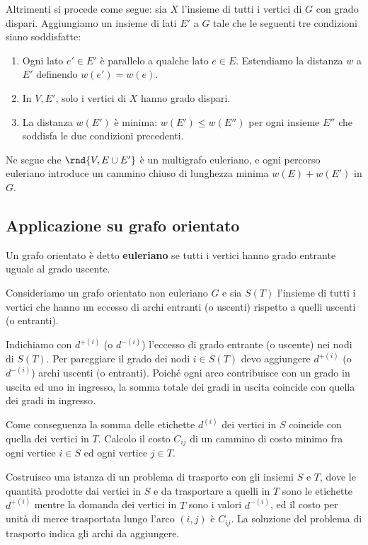 \documentclass[\main/main.tex]{subfiles}
\begin{document}
Altrimenti si procede come segue: sia \(X\) l'insieme di tutti i vertici di \(G\) con grado dispari. Aggiungiamo un insieme di lati \(E'\) a \(G\) tale che le seguenti tre condizioni siano soddisfatte:
\begin{enumerate}
	\item Ogni lato \(e' \in E'\) è parallelo a qualche lato \(e \in E\). Estendiamo la distanza \(w\) a \(E'\) definendo \(w(e') = w(e)\).
	\item In \(V, E'\), solo i vertici di \(X\) hanno grado dispari.
	\item La distanza \(w(E')\) è minima: \(w(E') \leq w(E'')\) per ogni insieme \(E''\) che soddisfa le due condizioni precedenti.
\end{enumerate}
Ne segue che \(\rnd{V, E \cup E'}\) è un multigrafo euleriano, e ogni percorso euleriano introduce un cammino chiuso di lunghezza minima \(w(E) + w(E')\) in \(G\).

\subsection{Applicazione su grafo orientato}
\begin{definition}
	Un grafo orientato è detto \textbf{euleriano} se tutti i vertici hanno grado entrante uguale al grado uscente.
\end{definition}
Consideriamo un grafo orientato non euleriano \(G\) e sia \(S(T)\) l'insieme di tutti i vertici che hanno un eccesso di archi entranti (o uscenti) rispetto a quelli uscenti (o entranti).

Indichiamo con \(d^{+(i)}\) (o \(d^{-(i)}\)) l'eccesso di grado entrante (o uscente) nei nodi di \(S(T)\). Per pareggiare il grado dei nodi \(i \in S(T)\) devo aggiungere \(d^{+(i)}\) (o \(d^{-(i)}\)) archi uscenti (o entranti). Poiché ogni arco contribuisce con un grado in uscita ed uno in ingresso, la somma totale dei gradi in uscita coincide con quella dei gradi in ingresso.

Come conseguenza la somma delle etichette \(d^{(i)}\) dei vertici in \(S\) coincide con quella dei vertici in \(T\). Calcolo il costo \(C_{ij}\) di un cammino di costo minimo fra ogni vertice \(i \in S\) ed ogni vertice \(j \in T\).

Costruisco una istanza di un problema di trasporto con gli insiemi \(S\) e \(T\), dove le quantità prodotte dai vertici in \(S\) e da trasportare a quelli in \(T\) sono le etichette \(d^{+(i)}\) mentre la domanda dei vertici in \(T\) sono i valori \(d^{-(i)}\), ed il costo per unità di merce trasportata lungo l'arco \((i,j)\) è \(C_{ij}\). La soluzione del problema di trasporto indica gli archi da aggiungere.
\end{document}
